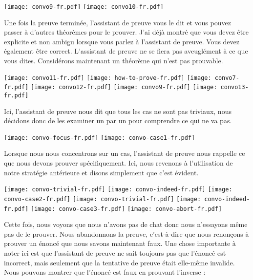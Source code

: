 \begin{center}
  \texttt{[image: convo9-fr.pdf]}
  \texttt{[image: convo10-fr.pdf]}
\end{center}

Une fois la preuve terminée, l'assistant de preuve vous le dit et vous pouvez
passer à d'autres théorèmes pour le prouver. J'ai déjà montré que vous devez
être explicite et non ambigu lorsque vous parlez à l'assistant de preuve. Vous
devez également être correct.
L'assistant de preuve ne se fiera pas aveuglément à ce que vous dites.
%
Considérons maintenant un théorème qui n'est pas prouvable.

\begin{center}
  \texttt{[image: convo11-fr.pdf]}
  \texttt{[image: how-to-prove-fr.pdf]}
  \texttt{[image: convo7-fr.pdf]}
  \texttt{[image: convo12-fr.pdf]}
  \texttt{[image: convo9-fr.pdf]}
  \texttt{[image: convo13-fr.pdf]}
\end{center}

Ici, l'assistant de preuve nous dit que tous les cas ne sont pas triviaux, nous
décidons donc de les examiner un par un pour comprendre ce qui ne va pas.

\begin{center}
  \texttt{[image: convo-focus-fr.pdf]}
  \texttt{[image: convo-case1-fr.pdf]}
\end{center}

Lorsque nous nous concentrons sur un cas, l'assistant de preuve nous rappelle ce
que nous devons prouver spécifiquement. Ici, nous revenons à l'utilisation de
notre stratégie antérieure et disons simplement que c'est évident.

\begin{center}
  \texttt{[image: convo-trivial-fr.pdf]}
  \texttt{[image: convo-indeed-fr.pdf]}
  \texttt{[image: convo-case2-fr.pdf]}
  \texttt{[image: convo-trivial-fr.pdf]}
  \texttt{[image: convo-indeed-fr.pdf]}
  \texttt{[image: convo-case3-fr.pdf]}
  \texttt{[image: convo-abort-fr.pdf]}
\end{center}

Cette fois, nous voyons que nous n'avons pas de chat donc nous n'essayons même
pas de le prouver.
Nous abandonnons la preuve, c'est-à-dire que nous renonçons à prouver un
énoncé que nous savons maintenant faux.
Une chose importante à noter ici est que l'assistant de preuve ne sait toujours
pas que l'énoncé est incorrect, mais seulement que la tentative de preuve était elle-même invalide.
Nous pouvons montrer que l'énoncé est faux en prouvant l'inverse :

